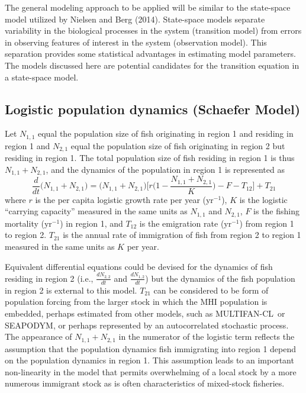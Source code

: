 \documentclass[12pt,letterpaper]{article}
\newcommand\SD{SEAPODYM}
\newcommand\MFCL{MULTIFAN-CL}
\newcommand\None{{N_{1,1}}}
\newcommand\Ntwo{{N_{2,1}}}
\newcommand\Nsum{{N_{1,1}+N_{2,1}}}
\newcommand\peryr{yr$^{-1}$}
\begin{document}
The general modeling approach to be applied will be similar to the
state-space model utilized by Nielsen and Berg (2014). 
State-space models separate variability in the biological
processes in the system (transition model)
 from errors in observing features of interest
in the system (observation model). 
This separation provides some statistical advantages in
estimating model parameters. The models discussed here are potential
candidates for the transition equation in a state-space model.

\subsection*{Logistic population dynamics (Schaefer Model)}
Let $\None$ equal the population size of fish originating in region 1
and residing in region 1
and $\Ntwo$ equal the population size of fish originating in region 2
but residing in region 1.
The total population size of fish residing in region 1 is thus
$\Nsum$, and the dynamics of the population in region 1 is represented as
\begin{equation}
\frac{d}{dt}\big(\Nsum\big)=\big(\Nsum\big)\Big[r\Big(1-\frac{\Nsum}{K}\Big) -F - T_{12}\Big] + T_{21}
\label{eqn:basic}
\end{equation}
where $r$ is the per capita logistic growth rate per year (\peryr), $K$ is the
logistic ``carrying capacity'' measured in the same units as $\None$
and $\Ntwo$, $F$ is the fishing mortality (\peryr) in region 1, and $T_{12}$
is the emigration rate (\peryr) from region 1 to region 2. $T_{21}$
is the annual rate of immigration of fish from region 2 to region 1
measured in the same units as $K$ per year.

Equivalent differential equations could be devised for the dynamics of
fish residing in region 2 (i.e., $\frac{dN_{2,2}}{dt}$ and
$\frac{dN_{1,2}}{dt}$) but 
the dynamics of the fish population in region 2 is external to this
model. $T_{21}$ can be considered to be form of population forcing
from the larger stock in which the MHI population is embedded, perhaps
estimated from other models, such as \MFCL\ or \SD, or perhaps
represented by an
autocorrelated stochastic process. The appearance of
$\Nsum$ in the numerator of the logistic term reflects the assumption
that the population dynamics fish immigrating into region 1 depend on
the population dynamics in region 1. This assumption leads to an
important non-linearity in the model that permits overwhelming of a
local stock by a more numerous immigrant stock as is often characteristics of
mixed-stock fisheries.
\end{document}

